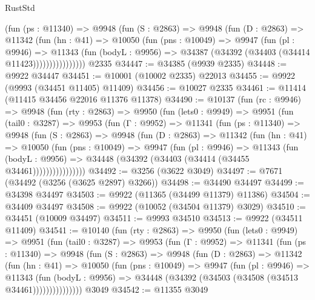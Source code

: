 \begin{lexlean}{RustStd}
\begin{coremodule}
                (fun (ps : @11340) =>
                @9948
                  (fun (S : @2863) =>
                  @9948
                    (fun (D : @2863) =>
                    @11342
                      (fun (hn : @41) =>
                      @10050
                        (fun (pns : @10049) =>
                        @9947
                          (fun (pl : @9946) =>
                          @11343
                            (fun (bodyL : @9956) =>
                            @34387 (@34392 (@34403 (@34414 @11423))))))))))))))))
    @2335
@34447 := @34385 (@9939 @2335)
@34448 := @9922 @34447
@34451 := @10001 (@10002 @2335) @22013
@34455 := @9922 (@9993 (@34451 @11405) @11409)
@34456 := @10027 @2335
@34461 := @11414 (@11415 @34456 @22016 @11376 @11378)
@34490 := @10137
    (fun (rc : @9946) =>
    @9948
      (fun (rty : @2863) =>
      @9950
        (fun (lets0 : @9949) =>
        @9951
          (fun (tail0 : @3287) =>
          @9953
            (fun (Γ : @9952) =>
            @11341
              (fun (ps : @11340) =>
              @9948
                (fun (S : @2863) =>
                @9948
                  (fun (D : @2863) =>
                  @11342
                    (fun (hn : @41) =>
                    @10050
                      (fun (pns : @10049) =>
                      @9947
                        (fun (pl : @9946) =>
                        @11343
                          (fun (bodyL : @9956) =>
                          @34448 (@34392 (@34403 (@34414 (@34455 @34461))))))))))))))))
@34492 := @3256 (@3622 @3049)
@34497 := @7671 (@34492 (@3256 (@3625 @2897) @3266))
@34498 := @34490 @34497
@34499 := @34398 @34497
@34503 := @9922 (@11365 (@34499 @11379) @11386)
@34504 := @34409 @34497
@34508 := @9922 (@10052 (@34504 @11379) @3029)
@34510 := @34451 (@10009 @34497)
@34511 := @9993 @34510
@34513 := @9922 (@34511 @11409)
@34541 := @10140
    (fun (rty : @2863) =>
    @9950
      (fun (lets0 : @9949) =>
      @9951
        (fun (tail0 : @3287) =>
        @9953
          (fun (Γ : @9952) =>
          @11341
            (fun (ps : @11340) =>
            @9948
              (fun (S : @2863) =>
              @9948
                (fun (D : @2863) =>
                @11342
                  (fun (hn : @41) =>
                  @10050
                    (fun (pns : @10049) =>
                    @9947
                      (fun (pl : @9946) =>
                      @11343
                        (fun (bodyL : @9956) =>
                        @34448 (@34392 (@34503 (@34508 (@34513 @34461)))))))))))))))
    @3049
@34542 := @11355 @3049

\end{coremodule}
\end{lexlean}
